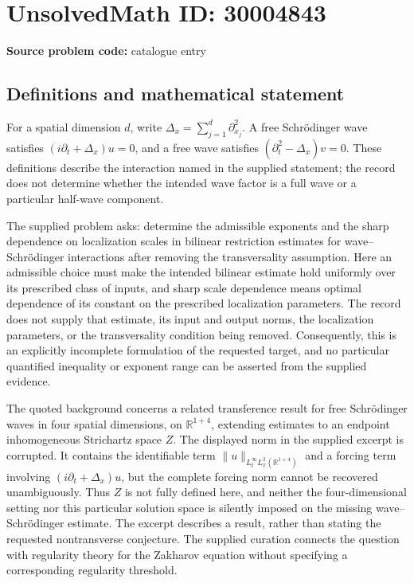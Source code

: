 \documentclass[11pt]{article}
\newcommand{\R}{\mathbb{R}}
\begin{document}
\section*{UnsolvedMath ID: 30004843}
\textbf{Source problem code:} catalogue entry
\subsection{Definitions and mathematical statement}
For a spatial dimension \(d\), write \(\Delta_x=\sum_{j=1}^d\partial_{x_j}^2\). A free Schr\"odinger wave satisfies \((i\partial_t+\Delta_x)u=0\), and a free wave satisfies \((\partial_t^2-\Delta_x)v=0\). These definitions describe the interaction named in the supplied statement; the record does not determine whether the intended wave factor is a full wave or a particular half-wave component.

The supplied problem asks: determine the admissible exponents and the sharp dependence on localization scales in bilinear restriction estimates for wave--Schr\"odinger interactions after removing the transversality assumption. Here an admissible choice must make the intended bilinear estimate hold uniformly over its prescribed class of inputs, and sharp scale dependence means optimal dependence of its constant on the prescribed localization parameters. The record does not supply that estimate, its input and output norms, the localization parameters, or the transversality condition being removed. Consequently, this is an explicitly incomplete formulation of the requested target, and no particular quantified inequality or exponent range can be asserted from the supplied evidence.

The quoted background concerns a related transference result for free Schr\"odinger waves in four spatial dimensions, on \(\R^{1+4}\), extending estimates to an endpoint inhomogeneous Strichartz space \(Z\). The displayed norm in the supplied excerpt is corrupted. It contains the identifiable term \(\|u\|_{L_t^\infty L_x^2(\R^{1+4})}\) and a forcing term involving \((i\partial_t+\Delta_x)u\), but the complete forcing norm cannot be recovered unambiguously. Thus \(Z\) is not fully defined here, and neither the four-dimensional setting nor this particular solution space is silently imposed on the missing wave--Schr\"odinger estimate. The excerpt describes a result, rather than stating the requested nontransverse conjecture. The supplied curation connects the question with regularity theory for the Zakharov equation without specifying a corresponding regularity threshold.
\end{document}
